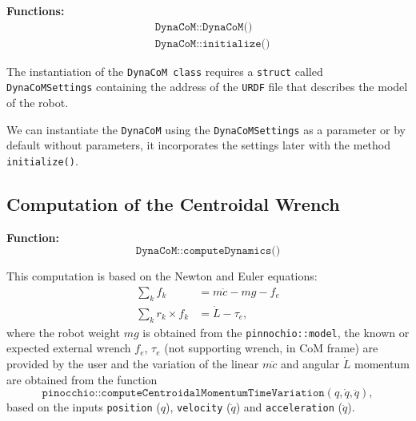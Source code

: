 \documentclass[12pt]{article}
\begin{document}
    {\bf Functions:}
    \begin{align*}
        &\texttt{DynaCoM::DynaCoM()}\\
        &\texttt{DynaCoM::initialize()}
    \end{align*}

    The instantiation of the \texttt{DynaCoM class} requires a \texttt{struct} called \texttt{DynaCoMSettings} containing the address of the \texttt{URDF} file that describes the model of the robot.

    We can instantiate the \texttt{DynaCoM} using the \texttt{DynaCoMSettings} as a parameter or by default without parameters, it incorporates the settings later with the method \texttt{initialize()}.




\clearpage

\subsection{Computation of the Centroidal Wrench}

\hrulefill

{\bf Function:}
%
\begin{equation*}
    \texttt{DynaCoM::computeDynamics()}
\end{equation*}

This computation is based on the Newton and Euler equations:
%
\begin{align}
    \sum_k f_k &= m\ddot{c} - m g - f_e \\
    \sum_k r_k\times f_k &= \dot{L} -\tau_e,
\end{align}
%
where the robot weight $m g$ is obtained from the \texttt{pinnochio::model}, the known or expected external wrench $f_e$, $\tau_e$ (not supporting wrench, in CoM frame) are provided by the user and the variation of the linear $m\ddot{c}$ and angular $\dot{L}$ momentum are obtained from the function
%
\begin{equation*}
    \texttt{pinocchio::computeCentroidalMomentumTimeVariation}(q, \dot{q}, \ddot{q}),
\end{equation*}
%
based on the inputs \texttt{position} ($q$), \texttt{velocity} ($\dot{q}$) and \texttt{acceleration} ($\ddot{q}$).
\end{document}

